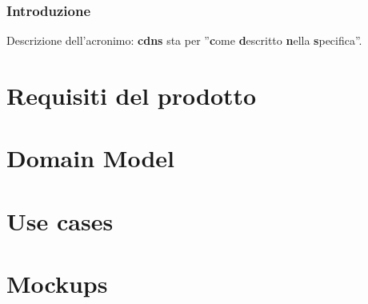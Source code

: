 \documentclass[a4paper, 12pt]{report}
\begin{document}
\tableofcontents

\newpage

\section*{Introduzione}
Descrizione dell'acronimo: \textbf{cdns} sta per ''\textbf{c}ome
\textbf{d}escritto \textbf{n}ella \textbf{s}pecifica''.

\part{Requisiti del prodotto}



\part{Domain Model}



\part{Use cases}



\part{Mockups}


\end{document}
